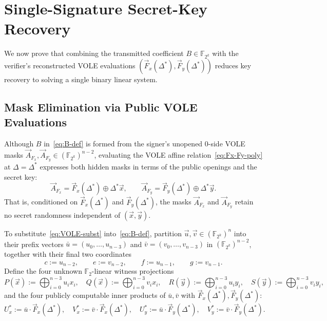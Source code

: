 \documentclass[11pt,a4paper]{article}
\theoremstyle{definition}
\theoremstyle{remark}
\newcommand{\Ftwo}{\mathbb{F}_2}
\newcommand{\Ftwok}{\mathbb{F}_{2^k}}
\begin{document}
\section{Single-Signature Secret-Key Recovery}
\label{sec:key-recovery}

We now prove that combining the transmitted coefficient $B \in \Ftwok$ with the verifier's reconstructed VOLE evaluations $(\vec{F}_x(\Delta^*), \vec{F}_y(\Delta^*))$ reduces key recovery to solving a single binary linear system.

\subsection{Mask Elimination via Public VOLE Evaluations}
Although $B$ in~\eqref{eq:B-def} is formed from the signer's unopened $0$-side VOLE masks $\vec{A}_{F_x}, \vec{A}_{F_y} \in (\Ftwok)^{n-2}$, evaluating the VOLE affine relation~\eqref{eq:Fx-Fy-poly} at $\Delta = \Delta^*$ expresses both hidden masks in terms of the public openings and the secret key:
\begin{equation}
\label{eq:VOLE-subst}
\vec{A}_{F_x} = \vec{F}_x(\Delta^*) \oplus \Delta^* \vec{x}, \qquad
\vec{A}_{F_y} = \vec{F}_y(\Delta^*) \oplus \Delta^* \vec{y}.
\end{equation}
That is, conditioned on $\vec{F}_x(\Delta^*)$ and $\vec{F}_y(\Delta^*)$, the masks $\vec{A}_{F_x}$ and $\vec{A}_{F_y}$ retain no secret randomness independent of $(\vec{x}, \vec{y})$.

To substitute~\eqref{eq:VOLE-subst} into~\eqref{eq:B-def}, partition $\vec{u}, \vec{v} \in (\Ftwok)^n$ into their prefix vectors $\bar{u} = (u_0, \dots, u_{n-3})$ and $\bar{v} = (v_0, \dots, v_{n-3})$ in $(\Ftwok)^{n-2}$, together with their final two coordinates
\[
c := u_{n-2}, \qquad e := v_{n-2}, \qquad f := u_{n-1}, \qquad g := v_{n-1}.
\]
Define the four unknown $\Ftwo$-linear witness projections
\begin{equation}
\label{eq:PQRS}
P(\vec{x}) := \bigoplus_{i=0}^{n-3} u_i x_i, \quad
Q(\vec{x}) := \bigoplus_{i=0}^{n-3} v_i x_i, \quad
R(\vec{y}) := \bigoplus_{i=0}^{n-3} u_i y_i, \quad
S(\vec{y}) := \bigoplus_{i=0}^{n-3} v_i y_i,
\end{equation}
and the four publicly computable inner products of $\bar{u}, \bar{v}$ with $\vec{F}_x(\Delta^*), \vec{F}_y(\Delta^*)$:
\begin{equation}
\label{eq:UxVxUyVy}
U_x^* := \bar{u} \cdot \vec{F}_x(\Delta^*), \quad
V_x^* := \bar{v} \cdot \vec{F}_x(\Delta^*), \quad
U_y^* := \bar{u} \cdot \vec{F}_y(\Delta^*), \quad
V_y^* := \bar{v} \cdot \vec{F}_y(\Delta^*).
\end{equation}
\end{document}
